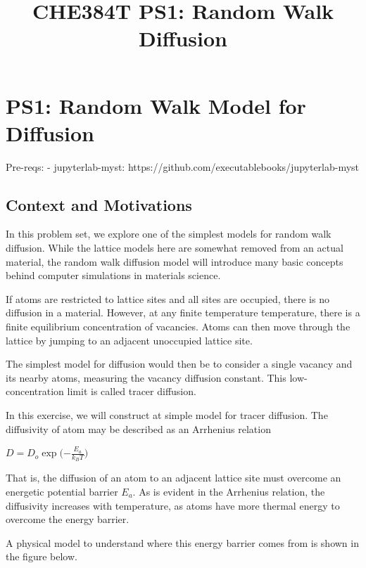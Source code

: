 \documentclass[11pt]{article}
\title{CHE384T PS1: Random Walk Diffusion}
\begin{document}
    
    \maketitle
    
    

    
    \hypertarget{ps1-random-walk-model-for-diffusion}{%
\section{PS1: Random Walk Model for
Diffusion}\label{ps1-random-walk-model-for-diffusion}}

Pre-reqs: - jupyterlab-myst:
https://github.com/executablebooks/jupyterlab-myst

    \hypertarget{context-and-motivations}{%
\subsection{Context and Motivations}\label{context-and-motivations}}

In this problem set, we explore one of the simplest models for random
walk diffusion. While the lattice models here are somewhat removed from
an actual material, the random walk diffusion model will introduce many
basic concepts behind computer simulations in materials science.

If atoms are restricted to lattice sites and all sites are occupied,
there is no diﬀusion in a material. However, at any finite temperature
temperature, there is a finite equilibrium concentration of vacancies.
Atoms can then move through the lattice by jumping to an adjacent
unoccupied lattice site.

The simplest model for diﬀusion would then be to consider a single
vacancy and its nearby atoms, measuring the vacancy diﬀusion constant.
This low-concentration limit is called tracer diﬀusion.

In this exercise, we will construct at simple model for tracer
diffusion. The diffusivity of atom may be described as an Arrhenius
relation

$D = D_o \exp\Big({-\frac{E_a}{k_B T}}\Big)$

That is, the diffusion of an atom to an adjacent lattice site must
overcome an energetic potential barrier $E_a$. As is evident in the
Arrhenius relation, the diffusivity increases with temperature, as atoms
have more thermal energy to overcome the energy barrier.

A physical model to understand where this energy barrier comes from is
shown in the figure below.
\end{document}
